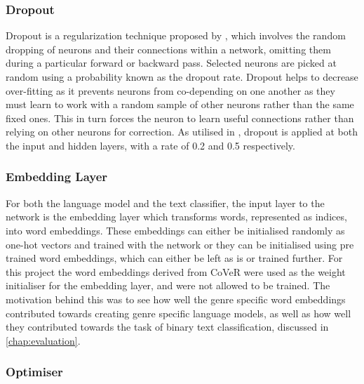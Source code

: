 \subsubsection{Dropout}
Dropout is a regularization technique proposed by \cite{Srivastava2014}, which involves the random dropping of neurons and their connections within a network, omitting them during a particular forward or backward pass. Selected neurons are picked at random using a probability known as the dropout rate. Dropout helps to decrease over-fitting as it prevents neurons from co-depending on one another as they must learn to work with a random sample of other neurons rather than the same fixed ones. This in turn forces the neuron to learn useful connections rather than relying on other neurons for correction. As utilised in \cite{Srivastava2014}, dropout is applied at both the input and hidden layers, with a rate of 0.2 and 0.5 respectively.
\subsubsection{Embedding Layer}
For both the language model and the text classifier, the input layer to the network is the embedding layer which transforms words, represented as indices, into word embeddings. These embeddings can either be initialised randomly as one-hot vectors and trained with the network or they can be initialised using pre trained word embeddings, which can either be left as is or trained further. For this project the word embeddings derived from CoVeR were used as the weight initialiser for the embedding layer, and were not allowed to be trained. The motivation behind this was to see how well the genre specific word embeddings contributed towards creating genre specific language models, as well as how well they contributed towards the task of binary text classification, discussed in \autoref{chap:evaluation}.
\subsubsection{Optimiser}

